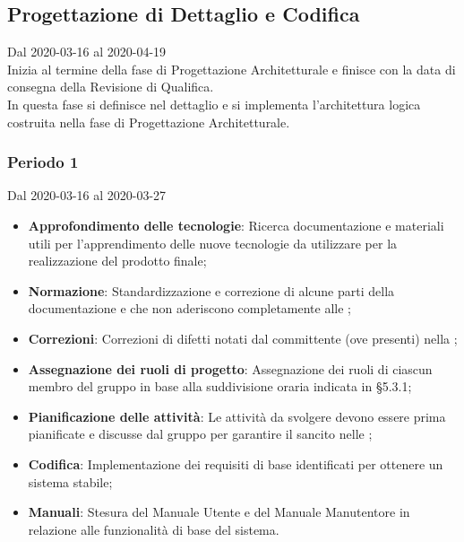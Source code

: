 \subsection{Progettazione di Dettaglio e Codifica}
Dal 2020-03-16 al 2020-04-19\\
Inizia al termine della fase di Progettazione Architetturale e finisce con la data di consegna della Revisione di Qualifica.\\
In questa fase si definisce nel dettaglio e si implementa l'architettura logica costruita nella fase di Progettazione Architetturale.

\subsubsection{Periodo 1} 
Dal 2020-03-16 al 2020-03-27\\
\begin{itemize}
	\item \textbf{Approfondimento delle tecnologie}: Ricerca documentazione e materiali utili per l'apprendimento delle nuove tecnologie da utilizzare per la realizzazione del prodotto finale;
	\item \textbf{Normazione}: Standardizzazione e correzione di alcune parti della documentazione e che non aderiscono completamente alle \NdP{};
	\item \textbf{Correzioni}: Correzioni di difetti notati dal committente (ove presenti) nella ;
	\item \textbf{Assegnazione dei ruoli di progetto}: Assegnazione dei ruoli di ciascun membro del gruppo in base alla suddivisione oraria indicata in §5.3.1;
	\item \textbf{Pianificazione delle attività}: Le attività da svolgere devono essere prima pianificate e discusse dal gruppo per garantire il  sancito nelle \NdP{};
	\item \textbf{Codifica}: Implementazione dei requisiti di base identificati per ottenere un sistema stabile;
	\item \textbf{Manuali}: Stesura del Manuale Utente e del Manuale Manutentore in relazione alle funzionalità di base del sistema.
\end{itemize}

